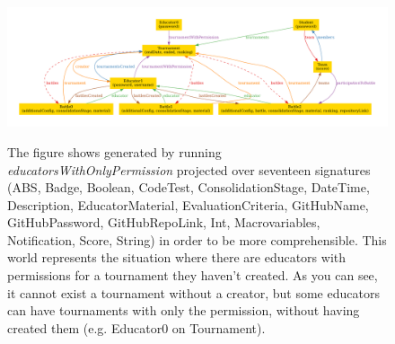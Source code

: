 \begin{figure}[h]
\centering
\includegraphics[width=1\linewidth]{RASD/4Alloy/res/educatorsWithOnlyPermission.pdf}
\label{fig:educatorsWithOnlyPermission_alloy}
\caption{The figure shows generated by running \textit{educatorsWithOnlyPermission} projected over seventeen signatures (ABS, Badge, Boolean, CodeTest, ConsolidationStage, DateTime, Description, EducatorMaterial, EvaluationCriteria, GitHubName, GitHubPassword, GitHubRepoLink, Int, Macrovariables, Notification, Score, String) in order to be more comprehensible. This world represents the situation where there are educators with permissions for a tournament they haven't created. As you can see, it cannot exist a tournament without a creator, but some educators can have tournaments with only the permission, without having created them (e.g. Educator0 on Tournament).}
\end{figure}



